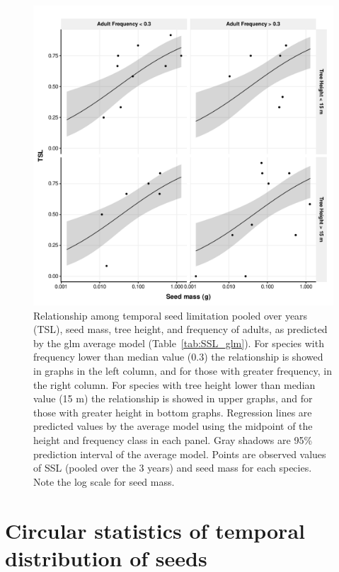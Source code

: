 \documentclass{article}
\begin{document}
\begin{figure}[h!]
  \centering
  \includegraphics[width=\textwidth]{../figures/TSL_all_pred_prob_glm}
  \caption{Relationship among temporal seed limitation pooled over
    years (TSL), seed mass, tree height, and frequency of adults, as
    predicted by the glm average model (Table~\ref{tab:SSL_glm}). For
    species with frequency lower than median value (0.3) the
    relationship is showed in graphs in the left column, and for those
    with greater frequency, in the right column. For species with tree
    height lower than median value (15 m) the relationship is showed
    in upper graphs, and for those with greater height in bottom
    graphs. Regression lines are predicted values by the average model
    using the midpoint of the height and frequency class in each
    panel. Gray shadows are 95\% prediction interval of the average
    model. Points are observed values of SSL (pooled over the 3 years)
    and seed mass for each species. Note the log scale for seed mass.}
  \label{fig:TSL_glm}
\end{figure}


\section*{Circular statistics of temporal distribution of seeds}
\label{sec:circ-stat-temp}
\end{document}
